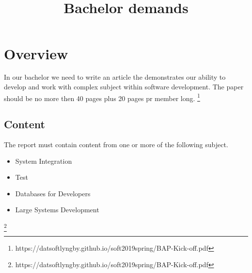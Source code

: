 \documentclass[a4paper]{article}
\title{Bachelor demands}
\begin{document}
    
    \section{Overview}
    In our bachelor we need to write an article the demonstrates our ability to develop and work with complex subject within software development.
    The paper should be no more then 40 pages plus 20 pages pr member long. \footnote{https://datsoftlyngby.github.io/soft2019spring/BAP-Kick-off.pdf}
        \subsection{Content}
            The report must contain content from one or more of the following subject.
            \begin{itemize}
                \item System Integration
                \item Test
                \item Databases for Developers
                \item Large Systems Development
            \end{itemize} \footnote{https://datsoftlyngby.github.io/soft2019spring/BAP-Kick-off.pdf}
\end{document}
